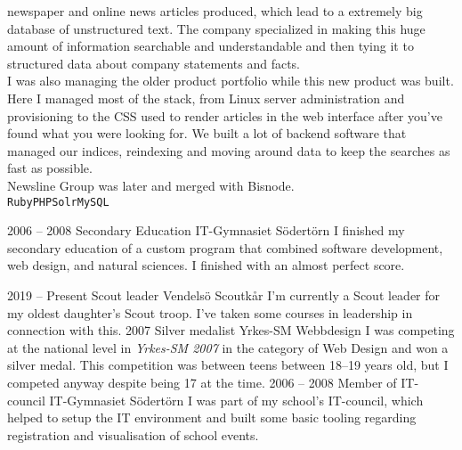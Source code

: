 \documentclass[9pt]{developercv} %
\begin{document}
\begin{entrylist}
{      newspaper and online news articles produced, which lead to a extremely
      big database of unstructured text. The company specialized in making this
      huge amount of information searchable and understandable and then tying
      it to structured data about company statements and facts.\\ I was also
      managing the older product portfolio while this new product was built.\\
      Here I managed most of the stack, from Linux server administration and
      provisioning to the CSS used to render articles in the web interface
      after you've found what you were looking for. We built a lot of backend
      software that managed our indices, reindexing and moving around data to
      keep the searches as fast as possible.\\ Newsline Group was later and
      merged with Bisnode.\\
      \texttt{Ruby}\slashsep\texttt{PHP}\slashsep\texttt{Solr}\slashsep\texttt{MySQL}}
\end{entrylist}



\begin{entrylist}
	\entry
		{2006 -- 2008}
		{Secondary Education}
		{IT-Gymnasiet Södertörn}
    {I finished my secondary education of a custom program that combined
      software development, web design, and natural sciences. I finished with
      an almost perfect score.}
\end{entrylist}



\begin{entrylist}
	\entry
		{2019 -- Present}
		{Scout leader}
		{Vendelsö Scoutkår}
    {I'm currently a Scout leader for my oldest daughter's Scout troop. I've
      taken some courses in leadership in connection with this.}
	\entry
		{2007}
		{Silver medalist}
		{Yrkes-SM Webbdesign}
    {I was competing at the national level in \textit{Yrkes-SM 2007} in the
      category of Web Design and won a silver medal. This competition was
      between teens between 18--19 years old, but I competed anyway despite
      being 17 at the time.}
	\entry
		{2006 -- 2008}
		{Member of IT-council}
		{IT-Gymnasiet Södertörn}
    {I was part of my school's IT-council, which helped to setup the IT
      environment and built some basic tooling regarding registration and
      visualisation of school events.}
\end{entrylist}
\end{document}
